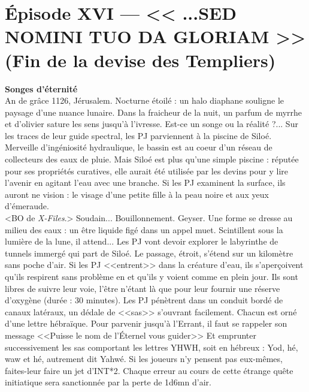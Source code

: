 \documentclass[11pt,twoside,a4paper]{book}
\begin{document}

\section*{{\'E}pisode XVI --- << \textbf{ ...SED NOMINI TUO DA GLORIAM } >> (Fin de la devise des Templiers)}


\textbf{\large Songes d'{\'e}ternit{\'e}}~\\

An de gr{\^a}ce 1126, J{\'e}rusalem. Nocturne {\'e}toil{\'e} : un halo diaphane souligne le paysage d'une nuance lunaire. Dans la fraicheur de la nuit, un parfum de myrrhe et d'olivier sature les sens jusqu'{\`a} l'ivresse. Est-ce un songe ou la r{\'e}alit{\'e} ?... Sur les traces de leur guide spectral, les PJ parviennent {\`a} la piscine de Silo{\'e}. Merveille d'ing{\'e}niosit{\'e} hydraulique, le bassin est au coeur d'un r{\'e}seau de collecteurs des eaux de pluie. Mais Silo{\'e} est plus qu'une simple piscine : r{\'e}put{\'e}e pour ses propri{\'e}t{\'e}s curatives, elle aurait {\'e}t{\'e} utilis{\'e}e par les devins pour y lire l'avenir en agitant l'eau avec une branche. Si les PJ examinent la surface, ils auront ne vision : le visage d'une petite fille {\`a} la peau noire et aux yeux d'{\'e}meraude.~\\

<BO de \emph{X-Files}.> Soudain... Bouillonnement. Geyser. Une forme se dresse au milieu des eaux : un {\^e}tre liquide fig{\'e} dans un appel muet. Scintillent sous la lumi{\`e}re de la lune, il attend... Les PJ vont devoir explorer le labyrinthe de tunnels immerg{\'e} qui part de Silo{\'e}. Le passage, {\'e}troit, s'{\'e}tend sur un kilom{\`e}tre sans poche d'air. Si les PJ <<entrent>> dans la cr{\'e}ature d'eau, ils s'aper\c{c}oivent qu'ils respirent sans probl{\`e}me en et qu'ils y voient comme en plein jour. Ils sont libres de suivre leur voie, l'{\^e}tre n'{\'e}tant l{\`a} que pour leur fournir une r{\'e}serve d'oxyg{\`e}ne (dur{\'e}e : 30 minutes). Les PJ p{\'e}n{\`e}trent dans un conduit bord{\'e} de canaux lat{\'e}raux, un d{\'e}dale de <<sas>> s'ouvrant facilement. Chacun est orn{\'e} d'une lettre h{\'e}bra{\"i}que. Pour parvenir jusqu'{\`a} l'Errant, il faut se rappeler son message <<Puisse le nom de l'{\'E}ternel vous guider>> Et emprunter successivement les sas comportant les lettres YHWH, soit en h{\'e}breux : Yod, h{\'e}, waw et h{\'e}, autrement dit Yahw{\'e}. Si les joueurs n'y pensent pas eux-m{\^e}mes, faites-leur faire un jet d'INT*2. Chaque erreur au cours de cette {\'e}trange qu{\^e}te initiatique sera sanctionn{\'e}e par la perte de 1d6mn d'air.~\\
\end{document}
